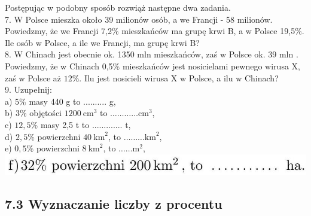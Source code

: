 \documentclass[10pt]{article}
\begin{document}
Postępując w podobny sposób rozwiąż następne dwa zadania.\\
7. W Polsce mieszka około 39 milionów osób, a we Francji - 58 milionów. Powiedzmy, że we Francji 7,2\% mieszkańców ma grupę krwi B, a w Polsce 19,5\%. Ile osób w Polsce, a ile we Francji, ma grupę krwi B?\\
8. W Chinach jest obecnie ok. 1350 mln mieszkańców, zaś w Polsce ok. 39 mln . Powiedzmy, że w Chinach 0,5\% mieszkańców jest nosicielami pewnego wirusa X, zaś w Polsce aż \(12 \%\). Ilu jest nosicieli wirusa X w Polsce, a ilu w Chinach?\\
9. Uzupełnij:\\
a) \(5 \%\) masy 440 g to .......... g,\\
b) \(3 \%\) objętości \(1200 \mathrm{~cm}^{3}\) to \(\ldots \ldots \ldots \ldots \mathrm{cm}^{3}\),\\
c) \(12,5 \%\) masy 2,5 t to ............. t,\\
d) \(2,5 \%\) powierzchni \(40 \mathrm{~km}^{2}\), to \(\ldots \ldots \ldots \mathrm{km}^{2}\),\\
e) \(0,5 \%\) powierzchni \(8 \mathrm{~km}^{2}\), to \(\ldots \ldots \mathrm{m}^{2}\),\\
\includegraphics[max width=\textwidth, center]{2024_11_21_8f01584889ff06348ae7g-129}

\subsection*{7.3 Wyznaczanie liczby z procentu}
\end{document}
